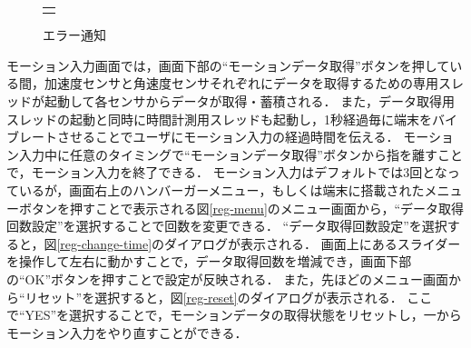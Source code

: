 \begin{figure}[bthp]
\begin{tabular}{c}
\begin{minipage}{0.33\hsize}
      \caption{エラー通知}
      \label{reg-input-name-toast}
    \end{minipage}
  \end{tabular}
\end{figure}

モーション入力画面では，画面下部の``モーションデータ取得''ボタンを押している間，加速度センサと角速度センサそれぞれにデータを取得するための専用スレッドが起動して各センサからデータが取得・蓄積される．
また，データ取得用スレッドの起動と同時に時間計測用スレッドも起動し，1秒経過毎に端末をバイブレートさせることでユーザにモーション入力の経過時間を伝える．
モーション入力中に任意のタイミングで``モーションデータ取得''ボタンから指を離すことで，モーション入力を終了できる．
モーション入力はデフォルトでは3回となっているが，画面右上のハンバーガーメニュー，もしくは端末に搭載されたメニューボタンを押すことで表示される図\ref{reg-menu}のメニュー画面から，``データ取得回数設定''を選択することで回数を変更できる．
``データ取得回数設定''を選択すると，図\ref{reg-change-time}のダイアログが表示される．
画面上にあるスライダーを操作して左右に動かすことで，データ取得回数を増減でき，画面下部の``OK''ボタンを押すことで設定が反映される．
また，先ほどのメニュー画面から``リセット''を選択すると，図\ref{reg-reset}のダイアログが表示される．
ここで``YES''を選択することで，モーションデータの取得状態をリセットし，一からモーション入力をやり直すことができる．

